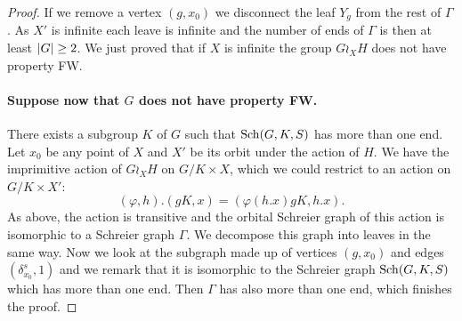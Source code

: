 \begin{proof}
If we remove a vertex $(g,x_0)$ we disconnect the leaf $Y_g$ from the rest of $\Gamma$. As $X'$ is infinite each leave is infinite and the number of ends of $\Gamma$ is then at least $\lvert G\rvert\geq 2$. We just proved that if $X$ is infinite the group $G\wr_XH$ does not have property FW.
%
%
%
\paragraph{Suppose now that $G$ does not have property FW.} There exists a subgroup $K$ of $G$ such that $\operatorname{Sch}(G,K,S)$ has more than one end.
Let $x_0$ be any point of $X$ and $X'$ be its orbit under the action of $H$.
We have the imprimitive action of $G\wr_XH$ on $G/K\times X$, which we could restrict to an action on $G/K\times X'$:
\[
	(\varphi,h).(gK,x) = (\varphi(h.x) gK, h.x).
\]
As above, the action is transitive and the orbital Schreier graph of this action is isomorphic to a Schreier graph $\Gamma$. We decompose this graph into leaves in the same way. Now we look at the subgraph made up of vertices $(g,x_0)$ and edges $(\delta_{x_0}^s,1)$ and we remark that it is isomorphic to the Schreier graph $\operatorname{Sch}(G,K,S)$ which has more than one end. Then $\Gamma$ has also more than one end, which finishes the proof.
\end{proof}